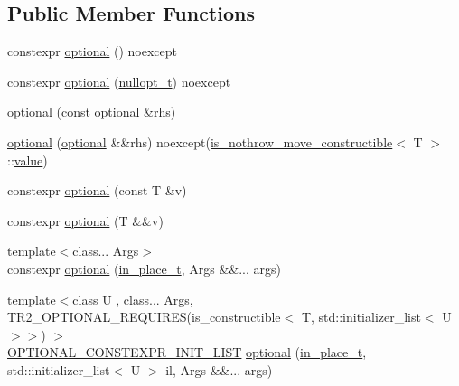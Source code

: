 \subsection*{Public Member Functions}
\begin{DoxyCompactItemize}
\item 
constexpr \mbox{\hyperlink{classstd_1_1experimental_1_1optional_a1584b48b65b92c4666c9899cd8b034e0}{optional}} () noexcept
\item 
constexpr \mbox{\hyperlink{classstd_1_1experimental_1_1optional_a4254acbb52e75c196ab02784ce4b1ce2}{optional}} (\mbox{\hyperlink{structstd_1_1experimental_1_1nullopt__t}{nullopt\+\_\+t}}) noexcept
\item 
\mbox{\hyperlink{classstd_1_1experimental_1_1optional_a08324fd562beb2f0a43b242596b47b2b}{optional}} (const \mbox{\hyperlink{classstd_1_1experimental_1_1optional}{optional}} \&rhs)
\item 
\mbox{\hyperlink{classstd_1_1experimental_1_1optional_aef3982e3d2d30c05d3d80ede551fda76}{optional}} (\mbox{\hyperlink{classstd_1_1experimental_1_1optional}{optional}} \&\&rhs) noexcept(\mbox{\hyperlink{structstd_1_1experimental_1_1is__nothrow__move__constructible}{is\+\_\+nothrow\+\_\+move\+\_\+constructible}}$<$ T $>$\+::\mbox{\hyperlink{classstd_1_1experimental_1_1optional_ad1277f09c288255dfe102b72e7107be6}{value}})
\item 
constexpr \mbox{\hyperlink{classstd_1_1experimental_1_1optional_acd004943841f3f762c73924471addd1b}{optional}} (const T \&v)
\item 
constexpr \mbox{\hyperlink{classstd_1_1experimental_1_1optional_a0eabb5769fc6c11a61bc004b314db7d1}{optional}} (T \&\&v)
\item 
{\footnotesize template$<$class... Args$>$ }\\constexpr \mbox{\hyperlink{classstd_1_1experimental_1_1optional_ab82edfd1f44d875a8bf3246eaed393b6}{optional}} (\mbox{\hyperlink{structstd_1_1experimental_1_1in__place__t}{in\+\_\+place\+\_\+t}}, Args \&\&... args)
\item 
{\footnotesize template$<$class U , class... Args, T\+R2\+\_\+\+O\+P\+T\+I\+O\+N\+A\+L\+\_\+\+R\+E\+Q\+U\+I\+R\+E\+S(is\+\_\+constructible$<$ T, std\+::initializer\+\_\+list$<$ U $>$$>$) $>$ }\\\mbox{\hyperlink{optional_8h_a7399114ed1c146a67741cdd1f681fcb5}{O\+P\+T\+I\+O\+N\+A\+L\+\_\+\+C\+O\+N\+S\+T\+E\+X\+P\+R\+\_\+\+I\+N\+I\+T\+\_\+\+L\+I\+ST}} \mbox{\hyperlink{classstd_1_1experimental_1_1optional_a52252028f9d99a680f7059ff48593985}{optional}} (\mbox{\hyperlink{structstd_1_1experimental_1_1in__place__t}{in\+\_\+place\+\_\+t}}, std\+::initializer\+\_\+list$<$ U $>$ il, Args \&\&... args)

\end{DoxyCompactItemize}
